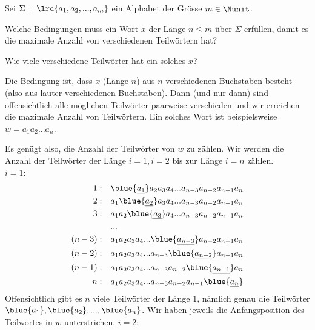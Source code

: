 \begin{mychallenge}
	Sei $\Sigma = \lrc{a_1,a_2,...,a_m}$ ein Alphabet der Grösse $m\in\Nunit$.
	\begin{aenum}
		\item Welche Bedingungen muss ein Wort $x$ der Länge $n\leq m$ über $\Sigma$ erfüllen, damit es die maximale Anzahl von verschiedenen Teilwörtern hat?
		\item Wie viele verschiedene Teilwörter hat ein solches $x$?
	\end{aenum}
\end{mychallenge}
\begin{myanswer}
	\begin{aenum}
		\item Die Bedingung ist, dass $x$ (Länge $n$) aus $n$ verschiedenen Buchstaben besteht (also aus lauter verschiedenen Buchstaben). Dann (und nur dann) sind offensichtlich alle möglichen Teilwörter paarweise verschieden und wir erreichen die maximale Anzahl von Teilwörtern.
		Ein solches Wort ist beispielsweise $w = a_1a_2...a_n$.
		\item Es genügt also, die Anzahl der Teilwörter von $w$ zu zählen. Wir werden die Anzahl der Teilwörter der Länge $i = 1, i = 2$ bis zur Länge $i = n$ zählen.\\
		\underline{$i = 1$}:
		\begin{align*}
			1:\quad     & \blue{\underline{a_1}}a_2a_3a_4...a_{n-3}a_{n-2}a_{n-1}a_n \\
			2:\quad     & a_1\blue{\underline{a_2}}a_3a_4...a_{n-3}a_{n-2}a_{n-1}a_n \\
			3:\quad     & a_1a_2\blue{\underline{a_3}}a_4...a_{n-3}a_{n-2}a_{n-1}a_n \\
			            & ...                                                        \\
			(n-3):\quad & a_1a_2a_3a_4...\blue{\underline{a_{n-3}}}a_{n-2}a_{n-1}a_n \\
			(n-2):\quad & a_1a_2a_3a_4...a_{n-3}\blue{\underline{a_{n-2}}}a_{n-1}a_n \\
			(n-1):\quad & a_1a_2a_3a_4...a_{n-3}a_{n-2}\blue{\underline{a_{n-1}}}a_n \\
			n: \quad    & a_1a_2a_3a_4...a_{n-3}a_{n-2}a_{n-1}\blue{\underline{a_n}}
		\end{align*}
		Offensichtlich gibt es $n$ viele Teilwörter der Länge $1$, nämlich genau die Teilwörter $\blue{a_1},\blue{a_2},...,\blue{a_n}$. Wir haben jeweils die Anfangsposition des Teilwortes in $w$ unterstrichen.
		\underline{$i = 2$}:
		\begin{align*}

\end{align*}
\end{aenum}
\end{myanswer}
